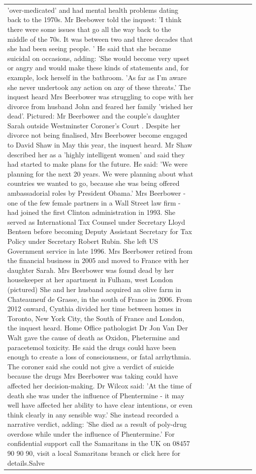 \begin{table}[H]
\begin{tabular}{lllrlllll}
'over-medicated' and had mental health problems dating back to the 1970s. Mr Beebower told the inquest: 'I think there were some issues that go all the way back to the middle of the 70s. It was between two and three decades that she had been seeing people. ' He said that she became suicidal on occasions, adding: 'She would become very upset or angry and would make these kinds of statements and, for example, lock herself in the bathroom. 'As far as I'm aware she never undertook any action on any of these threats.' The inquest heard Mrs Beerbower was struggling to cope with her divorce from husband John and feared her family 'wished her dead'. Pictured: Mr Beerbower and the couple's daughter Sarah outside Westminster Coroner's Court . Despite her divorce not being finalised, Mrs Beerbower become engaged to David Shaw in May this year, the inquest heard. Mr Shaw described her as a 'highly intelligent women' and said they had started to make plans for the future. He said: 'We were planning for the next 20 years. We were planning about what countries we wanted to go, because she was being offered ambassadorial roles by President Obama.' Mrs Beerbower - one of the few female partners in a Wall Street law firm - had joined the first Clinton administration in 1993. She served as International Tax Counsel under Secretary Lloyd Bentsen before becoming Deputy Assistant Secretary for Tax Policy under Secretary Robert Rubin. She left US Government service in late 1996. Mrs Beerbower retired from the financial business in 2005 and moved to France with her daughter Sarah. Mrs Beerbower was found dead by her housekeeper at her apartment in Fulham, west London (pictured) She and her husband acquired an olive farm in Chateauneuf de Grasse, in the south of France in 2006. From 2012 onward, Cynthia divided her time between homes in Toronto, New York City, the South of France and London, the inquest heard. Home Office pathologist Dr Jon Van Der Walt gave the cause of death as Oxidon, Phetermine and paracetemol toxicity. He said the drugs could have been enough to create a loss of consciousness, or fatal arrhythmia. The coroner said she could not give a verdict of suicide because the drugs Mrs Beerbower was taking could have affected her decision-making. Dr Wilcox said: 'At the time of death she was under the influence of Phentermine - it may well have affected her ability to have clear intentions, or even think clearly in any sensible way.' She instead recorded a narrative verdict, adding: 'She died as a result of poly-drug overdose while under the influence of Phentermine.' For confidential support call the Samaritans in the UK on 08457 90 90 90, visit a local Samaritans branch or click here for details.Salve \\

\end{tabular}
\end{table}
